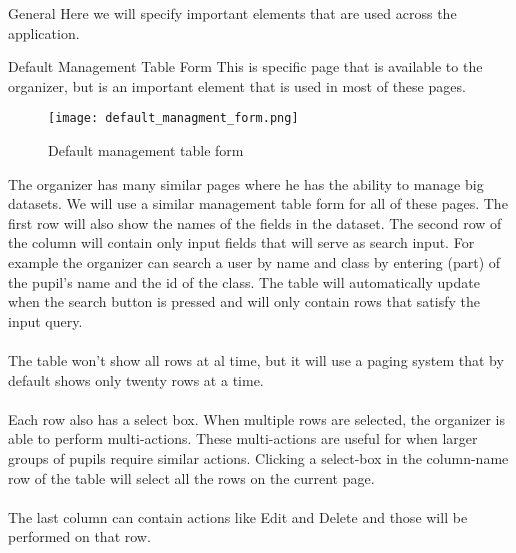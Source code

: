 \begin{section}{General}
	Here we will specify important elements that are used across the application.
	\begin{subsection}{Default Management Table Form}
		This is specific page that is available to the organizer, but is an important
		element that is used in most of these pages.
		\begin{figure}[h]
		  \centering
			\texttt{[image: default\_managment\_form.png]}
		  \caption{Default management table form}
		  \label{default_management_table_form}
		\end{figure}
		The organizer has many similar pages where he has the ability to manage big datasets.
		We will use a similar management table form for all of these pages.
		The first row will also show the names of the fields in the dataset.
		The second row of the column will contain only input fields that will serve as
		search input. For example the organizer can search a user by name and class by
		entering (part) of the pupil's name and the id of the class. The table will
		automatically update when the search button is pressed and will only contain
		rows that satisfy the input query.
		\\
		\\
		The table won't show all rows at al time, but it will use a paging system that
		by default shows only twenty rows at a time.\\
		\\
		Each row also has a select box. When multiple rows are selected, the organizer is
		able to perform multi-actions.
		These multi-actions are useful for when larger groups of pupils require similar
		actions. Clicking a select-box in the column-name row of the table will select
		all the rows on the current page.\\
		\\
		The last column can contain actions like Edit and Delete and those will be
		performed on that row.
	\end{subsection}
\end{section}
